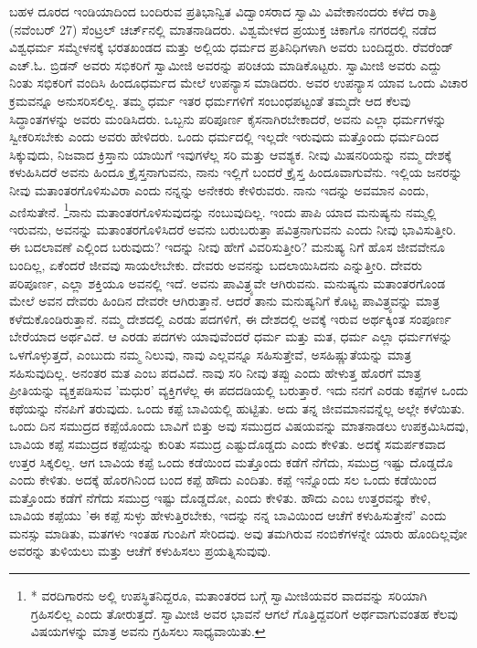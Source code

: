ಬಹಳ ದೂರದ ಇಂಡಿಯಾದಿಂದ ಬಂದಿರುವ ಪ್ರತಿಭಾನ್ವಿತ ವಿದ್ವಾಂಸರಾದ ಸ್ವಾಮಿ ವಿವೇಕಾನಂದರು ಕಳೆದ ರಾತ್ರಿ (ನವೆಂಬರ್ 27) ಸೆಂಟ್ರಲ್ ಚರ್ಚ್‌ನಲ್ಲಿ ಮಾತನಾಡಿದರು. ವಿಶ್ವಮೇಳದ ಪ್ರಯುಕ್ತ ಚಿಕಾಗೊ ನಗರದಲ್ಲಿ ನಡೆದ ವಿಶ್ವಧರ್ಮ ಸಮ್ಮೇಳನಕ್ಕೆ ಭರತಖಂಡದ ಮತ್ತು ಅಲ್ಲಿಯ ಧರ್ಮದ ಪ್ರತಿನಿಧಿಗಳಾಗಿ ಅವರು ಬಂದಿದ್ದರು. ರೆವರೆಂಡ್ ಎಚ್.ಓ. ಬ್ರಿಡನ್ ಅವರು ಸಭಿಕರಿಗೆ ಸ್ವಾಮೀಜಿ ಅವರನ್ನು ಪರಿಚಯ ಮಾಡಿಕೊಟ್ಟರು. ಸ್ವಾಮೀಜಿ ಅವರು ಎದ್ದು ನಿಂತು ಸಭಿಕರಿಗೆ ವಂದಿಸಿ ಹಿಂದೂಧರ್ಮದ ಮೇಲೆ ಉಪನ್ಯಾಸ ಮಾಡಿದರು. ಅವರ ಉಪನ್ಯಾಸ ಯಾವ ಒಂದು ವಿಚಾರ ಕ್ರಮವನ್ನೂ ಅನುಸರಿಸಲಿಲ್ಲ. ತಮ್ಮ ಧರ್ಮ ಇತರ ಧರ್ಮಗಳಿಗೆ ಸಂಬಂಧಪಟ್ಟಂತೆ ತಮ್ಮದೇ ಆದ ಕೆಲವು ಸಿದ್ಧಾಂತಗಳನ್ನು ಅವರು ಮಂಡಿಸಿದರು. ಒಬ್ಬನು ಪರಿಪೂರ್ಣ ಕೈಸನಾಗಿರಬೇಕಾದರೆ, ಅವನು ಎಲ್ಲಾ ಧರ್ಮಗಳನ್ನು ಸ್ವೀಕರಿಸಬೇಕು ಎಂದು ಅವರು ಹೇಳಿದರು. ಒಂದು ಧರ್ಮದಲ್ಲಿ ಇಲ್ಲದೇ ಇರುವುದು ಮತ್ತೊಂದು ಧರ್ಮದಿಂದ ಸಿಕ್ಕುವುದು, ನಿಜವಾದ ಕ್ರಿಸ್ತಾನು ಯಾಯಿಗೆ ಇವುಗಳೆಲ್ಲ ಸರಿ ಮತ್ತು ಆವಶ್ಯಕ. ನೀವು ಮಿಷನರಿಯನ್ನು ನಮ್ಮ ದೇಶಕ್ಕೆ ಕಳುಹಿಸಿದರೆ ಅವನು ಹಿಂದೂ ಕ್ರೈಸ್ತನಾಗುವನು, ನಾನು ಇಲ್ಲಿಗೆ ಬಂದರೆ ಕ್ರೈಸ್ತ ಹಿಂದೂವಾಗುವೆನು. ಇಲ್ಲಿಯ ಜನರನ್ನು ನೀವು ಮತಾಂತರಗೊಳಿಸುವಿರಾ ಎಂದು ನನ್ನನ್ನು ಅನೇಕರು ಕೇಳಿರುವರು. ನಾನು ಇದನ್ನು ಅವಮಾನ ಎಂದು, ಎಣಿಸುತೇನೆ. \footnote{* ವರದಿಗಾರನು ಅಲ್ಲಿ ಉಪಸ್ಥಿತನಿದ್ದರೂ, ಮತಾಂತರದ ಬಗ್ಗೆ ಸ್ವಾಮೀಜಿಯವರ ವಾದವನ್ನು ಸರಿಯಾಗಿ ಗ್ರಹಿಸಲಿಲ್ಲ ಎಂದು ತೋರುತ್ತದೆ. ಸ್ವಾಮೀಜಿ ಅವರ ಭಾವನೆ ಆಗಲೆ ಗೊತ್ತಿದ್ದವರಿಗೆ ಅರ್ಥವಾಗುವಂತಹ ಕೆಲವು ವಿಷಯಗಳನ್ನು ಮಾತ್ರ ಅವನು ಗ್ರಹಿಸಲು ಸಾಧ್ಯವಾಯಿತು.}ನಾನು ಮತಾಂತರಗೊಳಿಸುವುದನ್ನು ನಂಬುವುದಿಲ್ಲ. ಇಂದು ಪಾಪಿ ಯಾದ ಮನುಷ್ಯನು ನಮ್ಮಲ್ಲಿ ಇರುವನು, ಅವನನ್ನು ಮತಾಂತರಗೊಳಿಸಿದರೆ ಅವನು ಬರುಬರುತ್ತಾ ಪವಿತ್ರನಾಗುವನು ಎಂದು ನೀವು ಭಾವಿಸುತ್ತೀರಿ. ಈ ಬದಲಾವಣೆ ಎಲ್ಲಿಂದ ಬರುವುದು? ಇದನ್ನು ನೀವು ಹೇಗೆ ವಿವರಿಸುತ್ತೀರಿ? ಮನುಷ್ಯ ನಿಗೆ ಹೊಸ ಜೀವವೇನೂ ಬಂದಿಲ್ಲ, ಏಕೆಂದರೆ ಜೀವವು ಸಾಯಲೇಬೇಕು. ದೇವರು ಅವನನ್ನು ಬದಲಾಯಿಸಿದನು ಎನ್ನುತ್ತೀರಿ. ದೇವರು ಪರಿಪೂರ್ಣ, ಎಲ್ಲಾ ಶಕ್ತಿಯೂ ಅವನಲ್ಲಿ ಇದೆ. ಅವನು ಪಾವಿತ್ರ್ಯವೇ ಆಗಿರುವನು. ಮನುಷ್ಯನು ಮತಾಂತರಗೊಂಡ ಮೇಲೆ ಅವನ ದೇವರು ಹಿಂದಿನ ದೇವರೇ ಆಗಿರುತ್ತಾನೆ. ಆದರೆ ತಾನು ಮನುಷ್ಯನಿಗೆ ಕೊಟ್ಟ ಪಾವಿತ್ರ್ಯವನ್ನು ಮಾತ್ರ ಕಳೆದುಕೊಂಡಿರುತ್ತಾನೆ. ನಮ್ಮ ದೇಶದಲ್ಲಿ ಎರಡು ಪದಗಳಿಗೆ, ಈ ದೇಶದಲ್ಲಿ ಅವಕ್ಕೆ ಇರುವ ಅರ್ಥಕ್ಕಿಂತ ಸಂಪೂರ್ಣ ಬೇರೆಯಾದ ಅರ್ಥವಿದೆ. ಆ ಎರಡು ಪದಗಳು ಯಾವುವೆಂದರೆ ಧರ್ಮ ಮತ್ತು ಮತ, ಧರ್ಮ ಎಲ್ಲಾ ಧರ್ಮಗಳನ್ನು ಒಳಗೊಳ್ಳುತ್ತದೆ, ಎಂಬುದು ನಮ್ಮ ನಿಲುವು, ನಾವು ಎಲ್ಲವನ್ನೂ ಸಹಿಸುತ್ತೇವೆ, ಅಸಹಿಷ್ಣುತೆಯನ್ನು ಮಾತ್ರ ಸಹಿಸುವುದಿಲ್ಲ. ಅನಂತರ ಮತ ಎಂಬ ಪದವಿದೆ. ನಾವು ಸರಿ ನೀವು ತಪ್ಪು ಎಂದು ಹೇಳುತ್ತ ಹೊರಗೆ ಮಾತ್ರ ಪ್ರೀತಿಯನ್ನು ವ್ಯಕ್ತಪಡಿಸುವ 'ಮಧುರ' ವ್ಯಕ್ತಿಗಳೆಲ್ಲ ಈ ಪದದಡಿಯಲ್ಲಿ ಬರುತ್ತಾರೆ. ಇದು ನನಗೆ ಎರಡು ಕಪ್ಪೆಗಳ ಒಂದು ಕಥೆಯನ್ನು ನೆನಪಿಗೆ ತರುವುದು. ಒಂದು ಕಪ್ಪೆ ಬಾವಿಯಲ್ಲಿ ಹುಟ್ಟಿತು. ಅದು ತನ್ನ ಜೀವಮಾನವನ್ನೆಲ್ಲ ಅಲ್ಲೇ ಕಳೆಯಿತು. ಒಂದು ದಿನ ಸಮುದ್ರದ ಕಪ್ಪೆಯೊಂದು ಬಾವಿಗೆ ಬಿತ್ತು ಅವು ಸಮುದ್ರದ ವಿಷಯವನ್ನು ಮಾತನಾಡಲು ಉಪಕ್ರಮಿಸಿದವು, ಬಾವಿಯ ಕಪ್ಪೆ ಸಮುದ್ರದ ಕಪ್ಪೆಯನ್ನು ಕುರಿತು ಸಮುದ್ರ ಎಷ್ಟುದೊಡ್ಡದು ಎಂದು ಕೇಳಿತು. ಅದಕ್ಕೆ ಸಮರ್ಪಕವಾದ ಉತ್ತರ ಸಿಕ್ಕಲಿಲ್ಲ. ಆಗ ಬಾವಿಯ ಕಪ್ಪೆ ಒಂದು ಕಡೆಯಿಂದ ಮತ್ತೊಂದು ಕಡೆಗೆ ನೆಗೆದು, ಸಮುದ್ರ ಇಷ್ಟು ದೊಡ್ಡದೊ ಎಂದು ಕೇಳಿತು. ಅದಕ್ಕೆ ಹೊರಗಿನಿಂದ ಬಂದ ಕಪ್ಪೆ ಹೌದು ಎಂದಿತು. ಕಪ್ಪೆ ಇನ್ನೊಂದು ಸಲ ಒಂದು ಕಡೆಯಿಂದ ಮತ್ತೊಂದು ಕಡೆಗೆ ನೆಗೆದು ಸಮುದ್ರ ಇಷ್ಟು ದೊಡ್ಡದೋ, ಎಂದು ಕೇಳಿತು. ಹೌದು ಎಂಬ ಉತ್ತರವನ್ನು ಕೇಳಿ, ಬಾವಿಯ ಕಪ್ಪೆಯು 'ಈ ಕಪ್ಪೆ ಸುಳ್ಳು ಹೇಳುತ್ತಿರಬೇಕು, ಇದನ್ನು ನನ್ನ ಬಾವಿಯಿಂದ ಆಚೆಗೆ ಕಳುಹಿಸುತ್ತೇನೆ' ಎಂದು ಮನಸ್ಸು ಮಾಡಿತು, ಮತಗಳು ಇಂತಹ ಗುಂಪಿಗೆ ಸೇರಿದವು. ಅವು ತಮಗಿರುವ ನಂಬಿಕೆಗಳನ್ನೇ ಯಾರು ಹೊಂದಿಲ್ಲವೋ ಅವರನ್ನು ತುಳಿಯಲು ಮತ್ತು ಆಚೆಗೆ ಕಳುಹಿಸಲು ಪ್ರಯತ್ನಿಸುವುವು.

